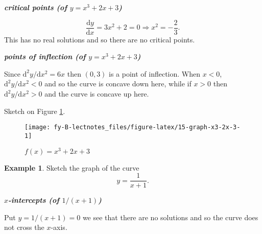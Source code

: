 \documentclass[
  english,
  11pt,
  oneside]{book}
\newcommand{\slide}{}
\theoremstyle{definition}
\theoremstyle{definition}
\newtheorem{example}{Example}[chapter]
\theoremstyle{definition}
\theoremstyle{definition}
\theoremstyle{remark}
\begin{document}
\begin{slidesonly}

\end{slidesonly}

\slide

\textbf{\emph{critical points (of \(y = x^3+2x+3\))}}

\begin{notslides}

\[
\frac{\mathrm{d} y}{\mathrm{d} x} = 3x^2+2 = 0 \Rightarrow x^2 = -\frac{2}{3}.
\]
This has no real solutions and so there are no critical points.

\end{notslides}

\slide

\textbf{\emph{points of inflection (of \(y = x^3+2x+3\))}}

\begin{notslides}

Since \(\mathrm{d}^2y/\mathrm{d} x^2 = 6x\) then \((0,3)\) is a point of
inflection.
When \(x < 0\), \(\mathrm{d}^2y/\mathrm{d} x^2<0\) and so the curve is
concave down here, while if \(x>0\) then \(\mathrm{d}^2y/\mathrm{d} x^2>0\) and the
curve is concave up here.

\end{notslides}

\begin{slidesonly}

\vfill

\end{slidesonly}

Sketch on Figure \ref{fig:15-graph-x3-2x-3}.

\begin{figure}

{\centering \texttt{[image: fy-B-lectnotes\_files/figure-latex/15-graph-x3-2x-3-1]} 

}

\caption{$f(x)=x^3+2x+3$}\label{fig:15-graph-x3-2x-3}
\end{figure}
\slide

\begin{example}
Sketch the graph of the curve
\[
y = \frac{1}{x+1}.
\]
\end{example}

\textbf{\emph{\(x\)-intercepts (of \(1/(x+1)\))}}

\begin{notslides}

Put \(y=1/(x+1) = 0\) we see that there are no solutions and so the curve does not cross the \(x\)-axis.

\end{notslides}
\end{document}
